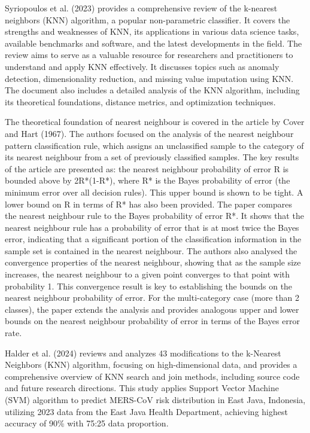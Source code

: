 \documentclass[11pt,a4paper]{article}
\begin{document}
Syriopoulos et al. (2023) provides a comprehensive review of the k-nearest neighbors (KNN) algorithm, a popular non-parametric classifier. It covers the strengths and weaknesses of KNN, its applications in various data science tasks, available benchmarks and software, and the latest developments in the field. The review aims to serve as a valuable resource for researchers and practitioners to understand and apply KNN effectively. It discusses topics such as anomaly detection, dimensionality reduction, and missing value imputation using KNN. The document also includes a detailed analysis of the KNN algorithm, including its theoretical foundations, distance metrics, and optimization techniques. 

The theoretical foundation of nearest neighbour is covered in the article by Cover and Hart (1967). The authors focused on the analysis of the nearest neighbour pattern classification rule, which assigns an unclassified sample to the category of its nearest neighbour from a set of previously classified samples. The key results of the article are presented as: the nearest neighbour probability of error R is bounded above by 2R*(1-R*), where R* is the Bayes probability of error (the minimum error over all decision rules). This upper bound is shown to be tight. A lower bound on R in terms of R* has also been provided. The paper compares the nearest neighbour rule to the Bayes probability of error R*. It shows that the nearest neighbour rule has a probability of error that is at most twice the Bayes error, indicating that a significant portion of the classification information in the sample set is contained in the nearest neighbour. The authors also analysed the convergence properties of the nearest neighbour, showing that as the sample size increases, the nearest neighbour to a given point converges to that point with probability 1. This convergence result is key to establishing the bounds on the nearest neighbour probability of error. For the multi-category case (more than 2 classes), the paper extends the analysis and provides analogous upper and lower bounds on the nearest neighbour probability of error in terms of the Bayes error rate.

Halder et al. (2024) reviews and analyzes 43 modifications to the k-Nearest Neighbors (KNN) algorithm, focusing on high-dimensional data, and provides a comprehensive overview of KNN search and join methods, including source code and future research directions. This study applies Support Vector Machine (SVM) algorithm to predict MERS-CoV risk distribution in East Java, Indonesia, utilizing 2023 data from the East Java Health Department, achieving highest accuracy of 90\% with 75:25 data proportion. 
\end{document}
